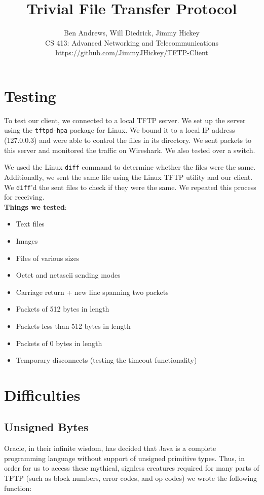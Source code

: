 \documentclass[12pt]{article}
\title{Trivial File Transfer Protocol}
\author{Ben Andrews, Will Diedrick, Jimmy Hickey\\CS 413: Advanced Networking and Telecommunications\\\href{https://github.com/JimmyJHickey/TFTP-Client}{https://github.com/JimmyJHickey/TFTP-Client}}
\begin{document}
	\maketitle
	\tableofcontents
	\clearpage
	
	\doublespacing
	
	\section{Testing}
	
	To test our client, we connected to a local TFTP server. We set up the server using the \lstinline|tftpd-hpa| package for Linux. We bound it to a local IP address (127.0.0.3) and were able to control the files in its directory. We sent packets to this server and monitored the traffic on Wireshark. We also tested over a switch.
	
	We used the Linux \lstinline|diff| command to determine whether the files were the same. Additionally, we sent the same file using the Linux TFTP utility and our client. We \lstinline|diff|'d the sent files to check if they were the same. We repeated this process for receiving. \\
	
	\textbf{Things we tested}:
	\singlespacing
	\begin{itemize}
		\item Text files
		\item Images
		\item Files of various sizes
		\item Octet and netascii sending modes
		\item Carriage return + new line spanning two packets
		\item Packets of 512 bytes in length
		\item Packets less than 512 bytes in length
		\item Packets of 0 bytes in length
		\item Temporary disconnects (testing the timeout functionality)
	\end{itemize}
	\doublespacing
	
	\section{Difficulties}
	\subsection{Unsigned Bytes}
	
	Oracle, in their infinite wisdom, has decided that Java is a complete programming language without support of unsigned primitive types. Thus, in order for us to access these mythical, signless creatures required for many parts of TFTP (such as block numbers, error codes, and op codes) we wrote the following function:
	
\end{document}
